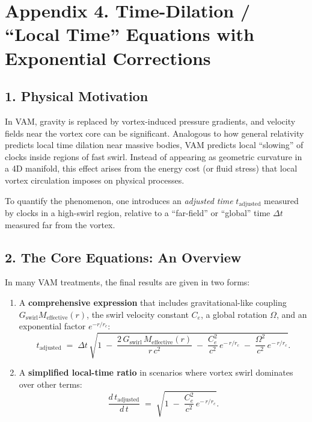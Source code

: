 

\section*{Appendix 4. Time-Dilation / “Local Time” Equations with Exponential Corrections}

\subsection*{1. Physical Motivation}

In VAM, gravity is replaced by vortex-induced pressure gradients, and velocity fields near the vortex core can be significant. Analogous to how general relativity predicts local time dilation near massive bodies, VAM predicts local “slowing” of clocks inside regions of fast swirl. Instead of appearing as geometric curvature in a 4D manifold, this effect arises from the energy cost (or fluid stress) that local vortex circulation imposes on physical processes.

To quantify the phenomenon, one introduces an \textit{adjusted time} \(t_{\text{adjusted}}\) measured by clocks in a high-swirl region, relative to a “far-field” or “global” time \(\Delta t\) measured far from the vortex.

\subsection*{2. The Core Equations: An Overview}

In many VAM treatments, the final results are given in two forms:

\begin{enumerate}
    \item A \textbf{comprehensive expression} that includes gravitational-like coupling \(G_{\text{swirl}} M_{\text{effective}}(r)\), the swirl velocity constant \(C_e\), a global rotation \(\Omega\), and an exponential factor \(e^{-r/r_c}\):
    \[
        t_{\text{adjusted}}
        \;=\;
        \Delta t \,\sqrt{
            1
            \;-\;
            \frac{2\,G_{\text{swirl}}\,M_{\text{effective}}(r)}{r\,c^2}
            \;-\;
            \frac{C_e^2}{c^2}\, e^{-\,r/r_c}
            \;-\;
            \frac{\Omega^2}{c^2}\, e^{-\,r/r_c}
        }.
    \]
    \item A \textbf{simplified local-time ratio} in scenarios where vortex swirl dominates over other terms:
    \[
        \frac{d\,t_{\text{adjusted}}}{d\,t}
        \;=\;
        \sqrt{
            1
            \;-\;
            \frac{C_e^2}{c^2}\, e^{-\,r/r_c}
        }.
    \]
\end{enumerate}

